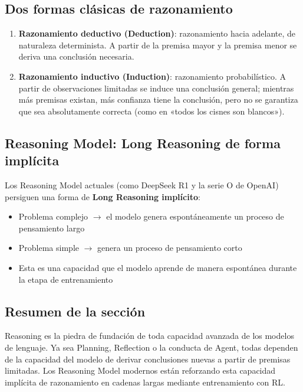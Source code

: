 \documentclass[a4paper]{article}
\begin{document}
\subsection{Dos formas clásicas de razonamiento}

\begin{enumerate}
    \item \textbf{Razonamiento deductivo (Deduction)}: razonamiento hacia adelante, de naturaleza determinista. A partir de la premisa mayor y la premisa menor se deriva una conclusión necesaria.
    \item \textbf{Razonamiento inductivo (Induction)}: razonamiento probabilístico. A partir de observaciones limitadas se induce una conclusión general; mientras más premisas existan, más confianza tiene la conclusión, pero no se garantiza que sea absolutamente correcta (como en «todos los cisnes son blancos»).
\end{enumerate}

\subsection{Reasoning Model: Long Reasoning de forma implícita}

Los Reasoning Model actuales (como DeepSeek R1 y la serie O de OpenAI) persiguen una forma de \textbf{Long Reasoning implícito}:
\begin{itemize}
    \item Problema complejo $\rightarrow$ el modelo genera espontáneamente un proceso de pensamiento largo
    \item Problema simple $\rightarrow$ genera un proceso de pensamiento corto
    \item Esta es una capacidad que el modelo aprende de manera espontánea durante la etapa de entrenamiento
\end{itemize}

\subsection{Resumen de la sección}

Reasoning es la piedra de fundación de toda capacidad avanzada de los modelos de lenguaje. Ya sea Planning, Reflection o la conducta de Agent, todas dependen de la capacidad del modelo de derivar conclusiones nuevas a partir de premisas limitadas. Los Reasoning Model modernos están reforzando esta capacidad implícita de razonamiento en cadenas largas mediante entrenamiento con RL.
\end{document}
